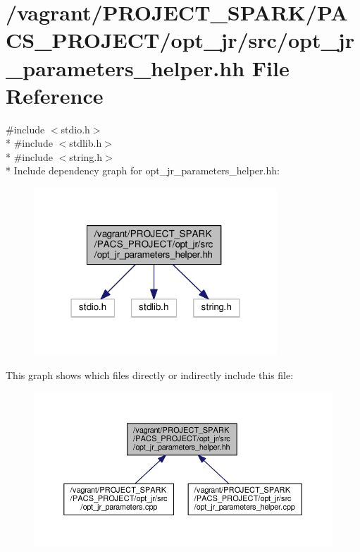 \hypertarget{opt__jr__parameters__helper_8hh}{\section{/vagrant/\-P\-R\-O\-J\-E\-C\-T\-\_\-\-S\-P\-A\-R\-K/\-P\-A\-C\-S\-\_\-\-P\-R\-O\-J\-E\-C\-T/opt\-\_\-jr/src/opt\-\_\-jr\-\_\-parameters\-\_\-helper.hh File Reference}
\label{opt__jr__parameters__helper_8hh}
}
{\ttfamily \#include $<$stdio.\-h$>$}\\*
{\ttfamily \#include $<$stdlib.\-h$>$}\\*
{\ttfamily \#include $<$string.\-h$>$}\\*
Include dependency graph for opt\-\_\-jr\-\_\-parameters\-\_\-helper.\-hh\-:
\nopagebreak
\begin{figure}[H]
\begin{center}
\leavevmode
\includegraphics[width=259pt]{opt__jr__parameters__helper_8hh__incl}
\end{center}
\end{figure}
This graph shows which files directly or indirectly include this file\-:\nopagebreak
\begin{figure}[H]
\begin{center}
\leavevmode
\includegraphics[width=350pt]{opt__jr__parameters__helper_8hh__dep__incl}
\end{center}
\end{figure}
